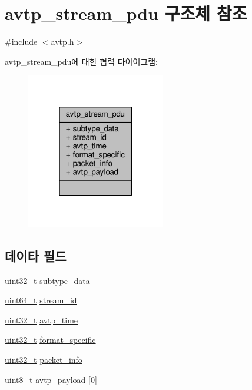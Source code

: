 \hypertarget{structavtp__stream__pdu}{}\section{avtp\+\_\+stream\+\_\+pdu 구조체 참조}
\label{structavtp__stream__pdu}


{\ttfamily \#include $<$avtp.\+h$>$}



avtp\+\_\+stream\+\_\+pdu에 대한 협력 다이어그램\+:
\nopagebreak
\begin{figure}[H]
\begin{center}
\leavevmode
\includegraphics[width=172pt]{structavtp__stream__pdu__coll__graph}
\end{center}
\end{figure}
\subsection*{데이타 필드}
\begin{DoxyCompactItemize}
\item 
\hyperlink{parse_8c_a6eb1e68cc391dd753bc8ce896dbb8315}{uint32\+\_\+t} \hyperlink{structavtp__stream__pdu_a3210e9f18fdc9c29cef7600c4d1e67e9}{subtype\+\_\+data}
\item 
\hyperlink{parse_8c_aec6fcb673ff035718c238c8c9d544c47}{uint64\+\_\+t} \hyperlink{structavtp__stream__pdu_af5af7b461263e29ceb91a8d3a8bc2c97}{stream\+\_\+id}
\item 
\hyperlink{parse_8c_a6eb1e68cc391dd753bc8ce896dbb8315}{uint32\+\_\+t} \hyperlink{structavtp__stream__pdu_a81ec49d93f7a916531f4d97214f47515}{avtp\+\_\+time}
\item 
\hyperlink{parse_8c_a6eb1e68cc391dd753bc8ce896dbb8315}{uint32\+\_\+t} \hyperlink{structavtp__stream__pdu_acbfc36b550978f88cf0a3d9d2b2ce0dd}{format\+\_\+specific}
\item 
\hyperlink{parse_8c_a6eb1e68cc391dd753bc8ce896dbb8315}{uint32\+\_\+t} \hyperlink{structavtp__stream__pdu_a737b6c4ff9f6954da39283e7351cbf58}{packet\+\_\+info}
\item 
\hyperlink{stdint_8h_aba7bc1797add20fe3efdf37ced1182c5}{uint8\+\_\+t} \hyperlink{structavtp__stream__pdu_af7de5ad9772244bef16d6266d874498d}{avtp\+\_\+payload} \mbox{[}0\mbox{]}
\end{DoxyCompactItemize}



